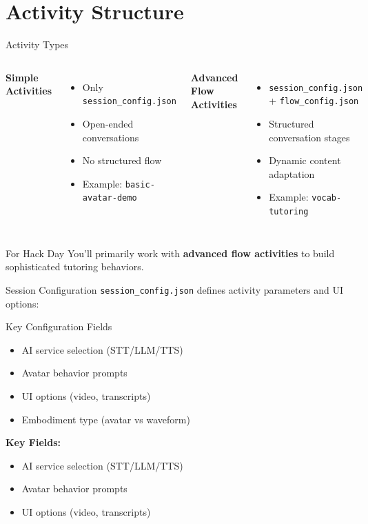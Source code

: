 \documentclass[aspectratio=169]{beamer}
\begin{document}
\section{Activity Structure}

\begin{frame}{Activity Types}
\begin{columns}[T]
\textbf{Simple Activities}
\begin{itemize}
    \item Only \texttt{session\_config.json}
    \item Open-ended conversations
    \item No structured flow
    \item Example: \texttt{basic-avatar-demo}
\end{itemize}

\textbf{Advanced Flow Activities}
\begin{itemize}
    \item \texttt{session\_config.json} + \texttt{flow\_config.json}
    \item Structured conversation stages
    \item Dynamic content adaptation
    \item Example: \texttt{vocab-tutoring}
\end{itemize}
\end{columns}

\vspace{0.5cm}

\begin{block}{For Hack Day}
You'll primarily work with \textbf{advanced flow activities} to build sophisticated tutoring behaviors.
\end{block}
\end{frame}

\begin{frame}{Session Configuration}
\texttt{session\_config.json} defines activity parameters and UI options:

\begin{block}{Key Configuration Fields}
\begin{itemize}
    \item AI service selection (STT/LLM/TTS)
    \item Avatar behavior prompts
    \item UI options (video, transcripts)
    \item Embodiment type (avatar vs waveform)
\end{itemize}
\end{block}

\vspace{0.3cm}
\textbf{Key Fields:}
\begin{itemize}
    \item AI service selection (STT/LLM/TTS)
    \item Avatar behavior prompts
    \item UI options (video, transcripts)
\end{itemize}
\end{frame}
\end{document}
